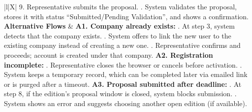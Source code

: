 \begin{xltabular}{\textwidth}{|l|X|}
        9. Representative submits the proposal. . System validates the proposal, stores it with status “Submitted/Pending Validation”, and shows a confirmation. \\ \hline
    \textbf{Alternative Flows} &
        \textbf{A1. Company already exists:} . At step 3, system detects that the company exists. . System offers to link the new user to the existing company instead of creating a new one. . Representative confirms and proceeds; account is created under that company. \newline
        \textbf{A2. Registration incomplete:} . Representative closes the browser or cancels before activation. . System keeps a temporary record, which can be completed later via emailed link or is purged after a timeout. \newline
        \textbf{A3. Proposal submitted after deadline:} . At step 8, if the edition’s proposal window is closed, system blocks submission. . System shows an error and suggests choosing another open edition (if available). \\ \hline
\end{xltabular}

